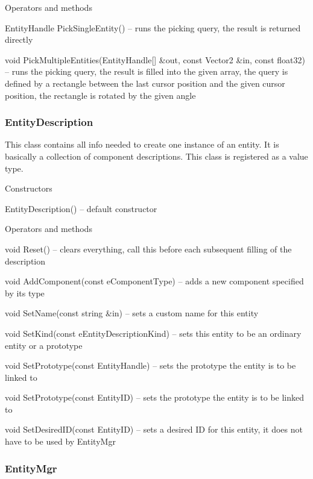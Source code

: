 \begin{titled-itemize}{Operators and methods}
  \item EntityHandle PickSingleEntity() -- runs the picking query, the result is returned directly
  \item void PickMultipleEntities(EntityHandle[] &out, const Vector2 &in, const float32) -- runs the picking query, the result is filled into the given array, the query is defined by a rectangle between the last cursor position and the given cursor position, the rectangle is rotated by the given angle
\end{titled-itemize}

\subsubsection{EntityDescription}

This class contains all info needed to create one instance of an entity. It is basically a collection of component descriptions. This class is registered as a value type.

\begin{titled-itemize}{Constructors}
  \item EntityDescription() -- default constructor
\end{titled-itemize}

\begin{titled-itemize}{Operators and methods}
  \item void Reset() -- clears everything, call this before each subsequent filling of the description
  \item void AddComponent(const eComponentType) -- adds a new component specified by its type
  \item void SetName(const string \&in) -- sets a custom name for this entity
  \item void SetKind(const eEntityDescriptionKind) -- sets this entity to be an ordinary entity or a prototype
  \item void SetPrototype(const EntityHandle) -- sets the prototype the entity is to be linked to
  \item void SetPrototype(const EntityID) -- sets the prototype the entity is to be linked to
  \item void SetDesiredID(const EntityID) -- sets a desired ID for this entity, it does not have to be used by EntityMgr
\end{titled-itemize}

\subsubsection{EntityMgr}

